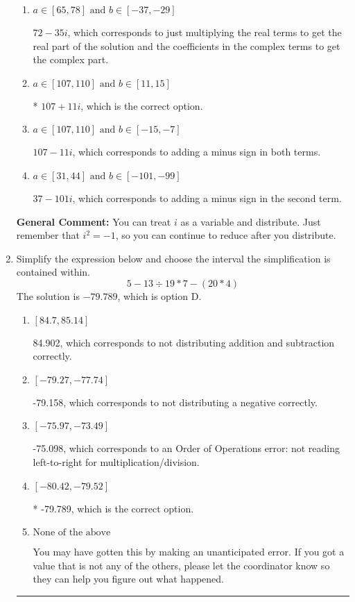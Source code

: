 \documentclass{extbook}[14pt]
\newcommand{\litem}[1]{\item #1

\rule{\textwidth}{0.4pt}}
\begin{document}
\begin{enumerate}
{\begin{enumerate}[label=\Alph*.]
 $37 + 101 i$, which corresponds to adding a minus sign in the first term.
\item \( a \in [65, 78] \text{ and } b \in [-37, -29] \)

 $72 - 35 i$, which corresponds to just multiplying the real terms to get the real part of the solution and the coefficients in the complex terms to get the complex part.
\item \( a \in [107, 110] \text{ and } b \in [11, 15] \)

* $107 + 11 i$, which is the correct option.
\item \( a \in [107, 110] \text{ and } b \in [-15, -7] \)

 $107 - 11 i$, which corresponds to adding a minus sign in both terms.
\item \( a \in [31, 44] \text{ and } b \in [-101, -99] \)

 $37 - 101 i$, which corresponds to adding a minus sign in the second term.
\end{enumerate}

\textbf{General Comment:} You can treat $i$ as a variable and distribute. Just remember that $i^2=-1$, so you can continue to reduce after you distribute.
}
\litem{
Simplify the expression below and choose the interval the simplification is contained within.
\[ 5 - 13 \div 19 * 7 - (20 * 4) \]The solution is \( -79.789 \), which is option D.\begin{enumerate}[label=\Alph*.]
\item \( [84.7, 85.14] \)

 84.902, which corresponds to not distributing addition and subtraction correctly.
\item \( [-79.27, -77.74] \)

 -79.158, which corresponds to not distributing a negative correctly.
\item \( [-75.97, -73.49] \)

 -75.098, which corresponds to an Order of Operations error: not reading left-to-right for multiplication/division.
\item \( [-80.42, -79.52] \)

* -79.789, which is the correct option.
\item \( \text{None of the above} \)

 You may have gotten this by making an unanticipated error. If you got a value that is not any of the others, please let the coordinator know so they can help you figure out what happened.
\end{enumerate}

}
\end{enumerate}
\end{document}
